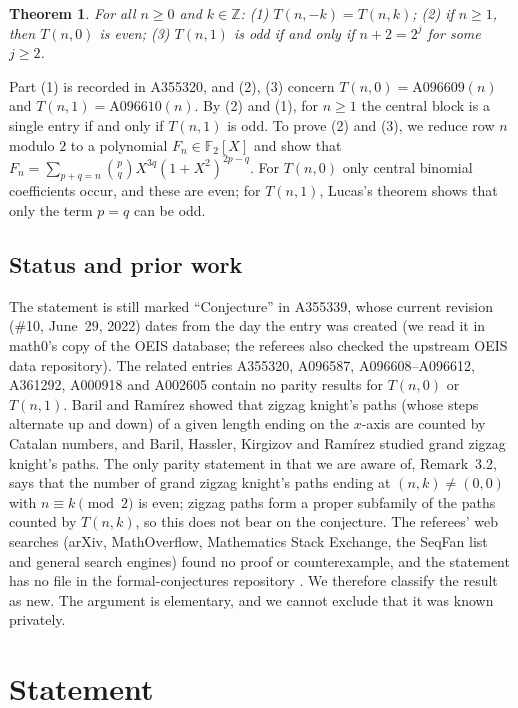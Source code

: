 \documentclass[11pt]{amsart}
\theoremstyle{plain}
\newtheorem{theorem}{Theorem}
\theoremstyle{definition}
\newcommand{\F}{\mathbb{F}_2}
\newcommand{\Z}{\mathbb{Z}}
\begin{document}
\begin{theorem}\label{thm:parity}
For all $n\ge0$ and $k\in\Z$: \textup{(1)} $T(n,-k)=T(n,k)$; \textup{(2)} if $n\ge1$, then $T(n,0)$ is even; \textup{(3)} $T(n,1)$ is odd if and only if $n+2=2^{j}$ for some $j\ge2$.
\end{theorem}

Part (1) is recorded in A355320, and (2), (3) concern $T(n,0)=\text{A096609}(n)$ and $T(n,1)=\text{A096610}(n)$. By (2) and (1), for $n\ge1$ the central block is a single entry if and only if $T(n,1)$ is odd.
To prove (2) and (3), we reduce row $n$ modulo $2$ to a polynomial $F_n\in\F[X]$ and show that $F_n=\sum_{p+q=n}\binom pq X^{3q}(1+X^2)^{2p-q}$. For $T(n,0)$ only central binomial coefficients occur, and these are even; for $T(n,1)$, Lucas's theorem \cite{Lucas} shows that only the term $p=q$ can be odd.

\subsection*{Status and prior work}
The statement is still marked ``Conjecture'' in A355339, whose current revision (\#10, June~29, 2022) dates from the day the entry was created (we read it in math0's copy of the OEIS database; the referees also checked the upstream OEIS data repository). The related entries A355320, A096587, A096608--A096612, A361292, A000918 and A002605 contain no parity results for $T(n,0)$ or $T(n,1)$.
Baril and Ram\'irez \cite{BR} showed that zigzag knight's paths (whose steps alternate up and down) of a given length ending on the $x$-axis are counted by Catalan numbers, and Baril, Hassler, Kirgizov and Ram\'irez \cite{BHKR} studied grand zigzag knight's paths. The only parity statement in \cite{BHKR} that we are aware of, Remark~3.2, says that the number of grand zigzag knight's paths ending at $(n,k)\ne(0,0)$ with $n\equiv k\pmod2$ is even; zigzag paths form a proper subfamily of the paths counted by $T(n,k)$, so this does not bear on the conjecture.
The referees' web searches (arXiv, MathOverflow, Mathematics Stack Exchange, the SeqFan list and general search engines) found no proof or counterexample, and the statement has no file in the formal-conjectures repository \cite{FC}.
We therefore classify the result as new. The argument is elementary, and we cannot exclude that it was known privately.

\section{Statement}\label{sec:statement}
\end{document}
